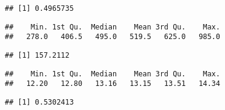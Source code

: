 \documentclass[
]{article}
\newenvironment{Shaded}{\begin{snugshade}}{\end{snugshade}}
\newcommand{\CommentTok}[1]{\textcolor[rgb]{0.56,0.35,0.01}{\textit{#1}}}
\newcommand{\DataTypeTok}[1]{\textcolor[rgb]{0.13,0.29,0.53}{#1}}
\newcommand{\KeywordTok}[1]{\textcolor[rgb]{0.13,0.29,0.53}{\textbf{#1}}}
\newcommand{\NormalTok}[1]{#1}
\newcommand{\OperatorTok}[1]{\textcolor[rgb]{0.81,0.36,0.00}{\textbf{#1}}}
\newcommand{\StringTok}[1]{\textcolor[rgb]{0.31,0.60,0.02}{#1}}
\begin{document}
\begin{verbatim}
## [1] 0.4965735
\end{verbatim}

\begin{Shaded}
\end{Shaded}

\begin{verbatim}
##    Min. 1st Qu.  Median    Mean 3rd Qu.    Max. 
##   278.0   406.5   495.0   519.5   625.0   985.0
\end{verbatim}

\begin{Shaded}
\end{Shaded}

\begin{verbatim}
## [1] 157.2112
\end{verbatim}

\begin{Shaded}
\end{Shaded}

\begin{verbatim}
##    Min. 1st Qu.  Median    Mean 3rd Qu.    Max. 
##   12.20   12.80   13.16   13.15   13.51   14.34
\end{verbatim}

\begin{Shaded}
\end{Shaded}

\begin{verbatim}
## [1] 0.5302413
\end{verbatim}

\begin{Shaded}
\end{Shaded}
\end{document}
